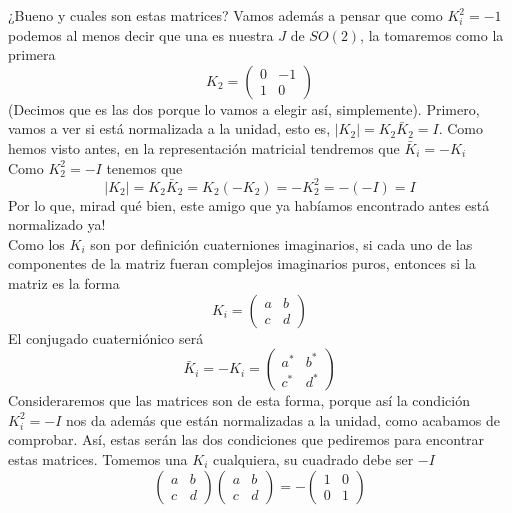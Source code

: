 \documentclass[12pt]{article}
\begin{document}
¿Bueno y cuales son estas matrices? Vamos además a pensar que como $K_i^2=-1$ podemos al menos decir que una es nuestra $J$ de $SO(2)$, la tomaremos como la primera
\begin{equation}
    K_2 =\begin{pmatrix}
        0 & -1 \\ 1 & 0
    \end{pmatrix}
\end{equation}
(Decimos que es las dos porque lo vamos a elegir así, simplemente).  Primero, vamos a ver si está normalizada a la unidad, esto es, $|K_2|=K_2 \bar K_2=I$. Como hemos visto antes, en la representación matricial tendremos que $\bar K_i =-K_i$
\\
Como $K_2^2=-I$ tenemos que
$$|K_2|=K_2\bar K_2=K_2(-K_2)=-K_2^2=-(-I)=I$$
Por lo que, mirad qué bien, este amigo que ya habíamos encontrado antes está normalizado ya! \\
Como los $K_i$ son por definición cuaterniones imaginarios, si cada uno de las componentes de la matriz fueran complejos imaginarios puros, entonces si la matriz es la forma
\begin{equation}
    K_i = \begin{pmatrix}
        a & b \\ c & d
    \end{pmatrix} 
\end{equation}
El conjugado cuaterniónico será 
\begin{equation}
    \bar K_i =-K_i= \begin{pmatrix}
        a^* & b^* \\ c^* & d^*
    \end{pmatrix}
\end{equation}
Consideraremos que las matrices son de esta forma, porque así la condición $K_i^2=-I$ nos da además que están normalizadas a la unidad, como acabamos de comprobar. Así, estas serán las dos condiciones que pediremos para encontrar estas matrices. Tomemos una $K_i$ cualquiera, su cuadrado debe ser $-I$ 
\begin{equation}
    \begin{pmatrix}
        a & b \\ c &d
    \end{pmatrix}\begin{pmatrix}
        a & b \\ c &d
    \end{pmatrix} =-\begin{pmatrix}
        1 & 0 \\ 0 & 1 
    \end{pmatrix}
\end{equation}
\end{document}
